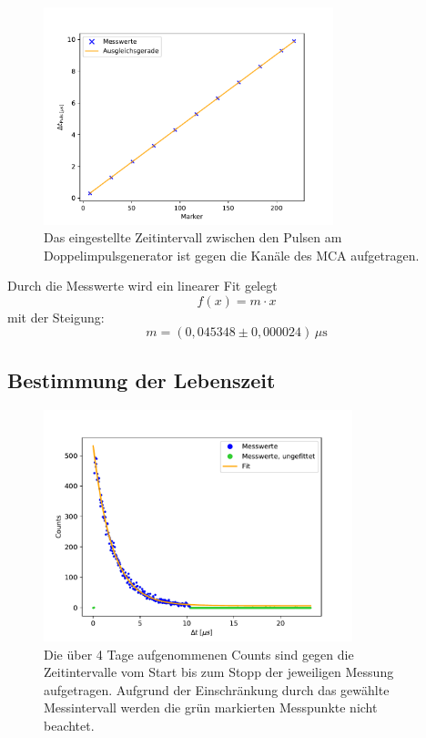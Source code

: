         \begin{figure}[h]
            \centering
            \includegraphics[width = 0.75\textwidth]{plots/Marker_Faktor.pdf}
            \caption{Das eingestellte Zeitintervall zwischen den Pulsen am Doppelimpulsgenerator ist gegen die Kanäle des MCA aufgetragen.}
            \label{fig:Marker_Faktor}
        \end{figure}

        \FloatBarrier

        Durch die Messwerte wird ein linearer Fit gelegt
        \begin{equation*}
            f(x) = m \cdot x
        \end{equation*}
        mit der Steigung:
        \begin{equation*}
            m = (0,045348 \pm 0,000024) \, \mu\text{s}
        \end{equation*}
    
    \newpage
    \subsection{Bestimmung der Lebenszeit}
        \begin{figure}[h]
            \centering
            \includegraphics[width = 0.8\textwidth]{plots/Lebenszeit.pdf}
            \caption{Die über 4 Tage aufgenommenen Counts sind gegen die Zeitintervalle vom Start bis zum Stopp der jeweiligen Messung aufgetragen. Aufgrund der Einschränkung durch das gewählte Messintervall werden die grün markierten Messpunkte nicht beachtet.}
            \label{fig:Lebenszeit}
        \end{figure}

